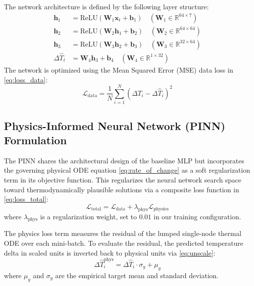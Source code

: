 The network architecture is defined by the following layer structure:
\begin{align*}
\mathbf{h}_1 &= \text{ReLU}(\mathbf{W}_1 \mathbf{x}_t + \mathbf{b}_1) \quad (\mathbf{W}_1 \in \mathbb{R}^{64 \times 7}) \\
\mathbf{h}_2 &= \text{ReLU}(\mathbf{W}_2 \mathbf{h}_1 + \mathbf{b}_2) \quad (\mathbf{W}_2 \in \mathbb{R}^{64 \times 64}) \\
\mathbf{h}_3 &= \text{ReLU}(\mathbf{W}_3 \mathbf{h}_2 + \mathbf{b}_3) \quad (\mathbf{W}_3 \in \mathbb{R}^{32 \times 64}) \\
\Delta \hat{T}_t &= \mathbf{W}_4 \mathbf{h}_3 + \mathbf{b}_4 \quad (\mathbf{W}_4 \in \mathbb{R}^{1 \times 32})
\end{align*}
The network is optimized using the Mean Squared Error (MSE) data loss in \eqref{eq:loss_data}:
\begin{equation}
\mathcal{L}_{\text{data}} = \frac{1}{N} \sum_{i=1}^N \left( \Delta T_i - \Delta \hat{T}_i \right)^2
\label{eq:loss_data}
\end{equation}

\subsection{Physics-Informed Neural Network (PINN) Formulation}
The PINN shares the architectural design of the baseline MLP but incorporates the governing physical ODE equation \eqref{eq:rate_of_change} as a soft regularization term in its objective function. This regularizes the neural network search space toward thermodynamically plausible solutions via a composite loss function in \eqref{eq:loss_total}:
\begin{equation}
\mathcal{L}_{\text{total}} = \mathcal{L}_{\text{data}} + \lambda_{\text{phys}} \mathcal{L}_{\text{physics}}
\label{eq:loss_total}
\end{equation}
where $\lambda_{\text{phys}}$ is a regularization weight, set to $0.01$ in our training configuration.

The physics loss term measures the residual of the lumped single-node thermal ODE over each mini-batch. To evaluate the residual, the predicted temperature delta in scaled units is inverted back to physical units via \eqref{eq:unscale}:
\begin{equation}
\Delta \hat{T}_i^{\text{phys}} = \Delta \hat{T}_i \cdot \sigma_y + \mu_y
\label{eq:unscale}
\end{equation}
where $\mu_y$ and $\sigma_y$ are the empirical target mean and standard deviation.

